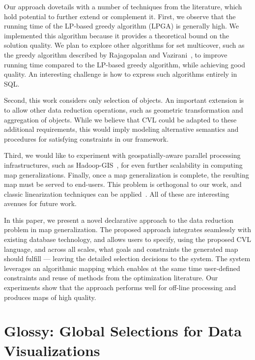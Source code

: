 \documentclass[11pt, oneside]{report}
\begin{document}
Our approach dovetails with a number of techniques from the literature, which hold potential to further extend or complement it. First, we observe that the running time of the LP-based greedy algorithm (LPGA) is generally high. We implemented this algorithm because it provides a theoretical bound on the solution quality. We plan to explore other algorithms for set multicover, such as the greedy algorithm described by Rajagopalan and Vazirani~\cite{rajagopalan1998primal}, to improve running time compared to the LP-based greedy algorithm, while achieving good quality. An interesting challenge is how to express such algorithms entirely in SQL.

Second, this work considers only selection of objects. An important extension is to allow other data reduction operations, such as geometric transformation and aggregation of objects. While we believe that CVL could be adapted to these additional requirements, this would imply modeling alternative semantics and procedures for satisfying constraints in our framework.

Third, we would like to experiment with geospatially-aware parallel processing infrastructures, such as Hadoop-GIS~\cite{Aji:2013:HadoopGIS}, for even further scalability in computing map generalizations. Finally, once a map generalization is complete, the resulting map must be served to end-users. This problem is orthogonal to our work, and classic linearization techniques can be applied~\cite{hilbert1891ueber}. All of these are interesting avenues for future work.


In this paper, we present a novel declarative approach to the data reduction problem in map generalization. 
The proposed approach integrates seamlessly with existing database technology, and allows users to specify, using the proposed CVL language, and across all scales, what goals and constraints the generated map should fulfill --- leaving the detailed selection decisions to the system. The system leverages an algorithmic mapping which enables at the same time user-defined constraints and reuse of methods from the optimization literature. Our experiments show that the approach performs well for off-line processing and produces maps of high quality.



\chapter{Glossy: Global Selections for Data Visualizations}
\label{chapter:glossy}
\lstset{
  language=sql
}
\end{document}
